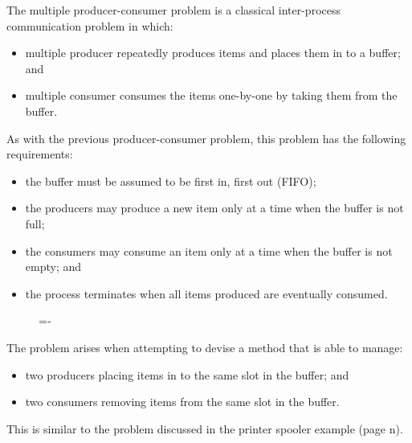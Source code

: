\documentclass[a4paper]{systems-software}
\begin{document}
The multiple producer-consumer problem is a classical inter-process communication problem in which:
\begin{itemize}
	\item multiple producer repeatedly produces items and places them in to a buffer; and
	\item multiple consumer consumes the items one-by-one by taking them from the buffer.
\end{itemize}

As with the previous producer-consumer problem, this problem has the following requirements:
\begin{itemize}
	\item the buffer must be assumed to be first in, first out (FIFO);
	\item the producers may produce a new item only at a time when the buffer is not full;
	\item the consumers may consume an item only at a time when the buffer is not empty; and
	\item the process terminates when all items produced are eventually consumed.
\end{itemize}

\begin{figure}[H]
  \lineskip=-\fboxrule
\end{figure}

The problem arises when attempting to devise a method that is able to manage:
\begin{itemize}
	\item two producers placing items in to the same slot in the buffer; and
	\item two consumers removing items from the same slot in the buffer.
\end{itemize}
This is similar to the problem discussed in the printer spooler example (page n).
\end{document}
